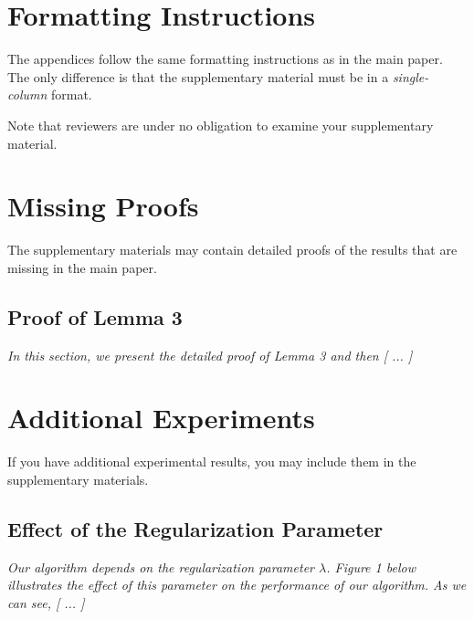 \documentclass[twoside]{article}
\begin{document}
\section{Formatting Instructions}

The appendices follow the same formatting instructions as in the main paper.
The only difference is that the supplementary material must be in a \emph{single-column} format.

Note that reviewers are under no obligation to examine your supplementary material.

\section{Missing Proofs}

The supplementary materials may contain detailed proofs of the results that are missing in the main paper.

\subsection{Proof of Lemma 3}

\textit{In this section, we present the detailed proof of Lemma 3 and then [ ... ]}

\section{Additional Experiments}

If you have additional experimental results, you may include them in the supplementary materials.

\subsection{Effect of the Regularization Parameter}

\textit{Our algorithm depends on the regularization parameter $\lambda$. Figure 1 below illustrates the effect of this parameter on the performance of our algorithm. As we can see, [ ... ]}
\end{document}
